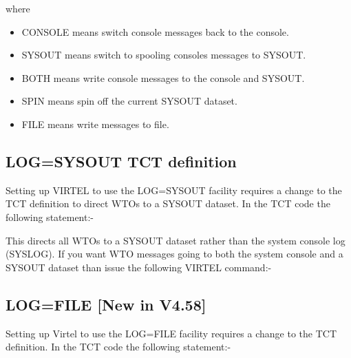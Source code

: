\documentclass[letterpaper,10pt,english]{sphinxmanual}
\begin{document}
where
\begin{itemize}
\item {} 
CONSOLE means switch console messages back to the console.

\item {} 
SYSOUT means switch to spooling consoles messages to SYSOUT.

\item {} 
BOTH means write console messages to the console and SYSOUT.

\item {} 
SPIN means spin off the current SYSOUT dataset.

\item {} 
FILE means write messages to file.

\end{itemize}


\subsection{LOG=SYSOUT TCT definition}
\label{\detokenize{audit_operations_ and_performance:log-sysout-tct-definition}}
Setting up VIRTEL to use the LOG=SYSOUT facility requires a change to the TCT definition to direct WTOs to a SYSOUT dataset. In the TCT code the following statement:-

\begin{sphinxVerbatim}[commandchars=\\\{\}]
\PYG{p}{[}\PYG{p}{[}\PYG{p}{]}\PYG{p}{]}

  
\end{sphinxVerbatim}

\newpage

This directs all WTOs to a SYSOUT dataset rather than the system console log (SYSLOG). If you want WTO messages going to both the system console and a SYSOUT dataset than issue the following VIRTEL command:-

\begin{sphinxVerbatim}[commandchars=\\\{\}]
 
\end{sphinxVerbatim}


\subsection{LOG=FILE {[}New in V4.58{]}}
\label{\detokenize{audit_operations_ and_performance:log-file-new-in-v4-58}}
Setting up Virtel to use the LOG=FILE facility requires a change to the TCT definition. In the TCT code the following statement:-
\end{document}

